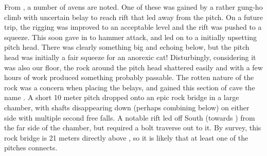 From , a number of avens are noted. One of these was
gained by a rather gung-ho climb with uncertain belay to reach rift that
led away from the pitch. On a future trip, the rigging was improved to
an acceptable level and the rift was pushed to a squeeze. This soon gave
in to hammer attack, and led on to a initially upsetting pitch head.
There was clearly something big and echoing below, but the pitch head
was initially a fair squeeze for an anorexic cat! Disturbingly,
considering it was also our floor, the rock around the pitch head
shattered easily and with a few hours of work produced something
probably passable. The rotten nature of the rock was a concern when
placing the belays, and gained this section of cave the name
. A short 10 meter pitch dropped onto an epic rock
bridge in a large chamber, with shafts disappearing down (perhaps
combining below) on either side with multiple second free falls. A
notable rift led off South (towards ) from the far side of the
chamber, but required a bolt traverse out to it. By survey, this rock
bridge is 21 meters directly above , so it
is likely that at least one of the pitches connects.


